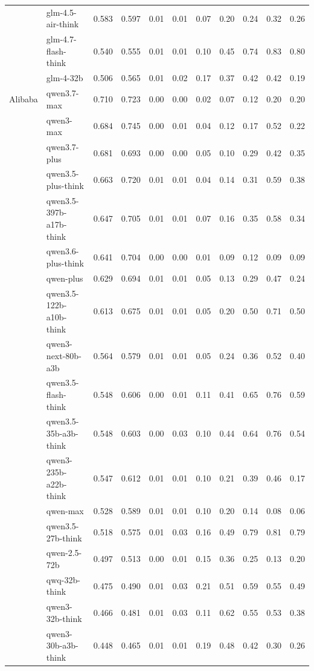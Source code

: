 \begin{longtable}{@{}ll rr rrrrrrr@{}}
 & glm-4.5-air-think & 0.583 & 0.597 & 0.01 & 0.01 & 0.07 & 0.20 & 0.24 & 0.32 & 0.26 \\
 & glm-4.7-flash-think & 0.540 & 0.555 & 0.01 & 0.01 & 0.10 & 0.45 & 0.74 & 0.83 & 0.80 \\
 & glm-4-32b & 0.506 & 0.565 & 0.01 & 0.02 & 0.17 & 0.37 & 0.42 & 0.42 & 0.19 \\
Alibaba & qwen3.7-max & 0.710 & 0.723 & 0.00 & 0.00 & 0.02 & 0.07 & 0.12 & 0.20 & 0.20 \\
 & qwen3-max & 0.684 & 0.745 & 0.00 & 0.01 & 0.04 & 0.12 & 0.17 & 0.52 & 0.22 \\
 & qwen3.7-plus & 0.681 & 0.693 & 0.00 & 0.00 & 0.05 & 0.10 & 0.29 & 0.42 & 0.35 \\
 & qwen3.5-plus-think & 0.663 & 0.720 & 0.01 & 0.01 & 0.04 & 0.14 & 0.31 & 0.59 & 0.38 \\
 & qwen3.5-397b-a17b-think & 0.647 & 0.705 & 0.01 & 0.01 & 0.07 & 0.16 & 0.35 & 0.58 & 0.34 \\
 & qwen3.6-plus-think & 0.641 & 0.704 & 0.00 & 0.00 & 0.01 & 0.09 & 0.12 & 0.09 & 0.09 \\
 & qwen-plus & 0.629 & 0.694 & 0.01 & 0.01 & 0.05 & 0.13 & 0.29 & 0.47 & 0.24 \\
 & qwen3.5-122b-a10b-think & 0.613 & 0.675 & 0.01 & 0.01 & 0.05 & 0.20 & 0.50 & 0.71 & 0.50 \\
 & qwen3-next-80b-a3b & 0.564 & 0.579 & 0.01 & 0.01 & 0.05 & 0.24 & 0.36 & 0.52 & 0.40 \\
 & qwen3.5-flash-think & 0.548 & 0.606 & 0.00 & 0.01 & 0.11 & 0.41 & 0.65 & 0.76 & 0.59 \\
 & qwen3.5-35b-a3b-think & 0.548 & 0.603 & 0.00 & 0.03 & 0.10 & 0.44 & 0.64 & 0.76 & 0.54 \\
 & qwen3-235b-a22b-think & 0.547 & 0.612 & 0.01 & 0.01 & 0.10 & 0.21 & 0.39 & 0.46 & 0.17 \\
 & qwen-max & 0.528 & 0.589 & 0.01 & 0.01 & 0.10 & 0.20 & 0.14 & 0.08 & 0.06 \\
 & qwen3.5-27b-think & 0.518 & 0.575 & 0.01 & 0.03 & 0.16 & 0.49 & 0.79 & 0.81 & 0.79 \\
 & qwen-2.5-72b & 0.497 & 0.513 & 0.00 & 0.01 & 0.15 & 0.36 & 0.25 & 0.13 & 0.20 \\
 & qwq-32b-think & 0.475 & 0.490 & 0.01 & 0.03 & 0.21 & 0.51 & 0.59 & 0.55 & 0.49 \\
 & qwen3-32b-think & 0.466 & 0.481 & 0.01 & 0.03 & 0.11 & 0.62 & 0.55 & 0.53 & 0.38 \\
 & qwen3-30b-a3b-think & 0.448 & 0.465 & 0.01 & 0.01 & 0.19 & 0.48 & 0.42 & 0.30 & 0.26 \\

\end{longtable}
